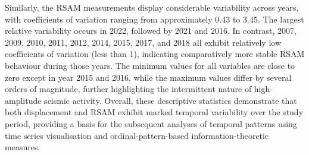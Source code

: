 \documentclass[12pt,a4paper]{article}
\begin{document}
Similarly, the RSAM measurements display considerable variability across years, with coefficients of variation ranging from approximately 0.43 to 3.45. The largest relative variability occurs in 2022, followed by 2021 and 2016. In contrast, 2007, 2009, 2010, 2011, 2012, 2014, 2015, 2017, and 2018 all exhibit relatively low coefficients of variation (less than 1), indicating comparatively more stable RSAM behaviour during those years. The minimum values for all variables are close to zero except in year 2015 and 2016, while the maximum values differ by several orders of magnitude, further highlighting the intermittent nature of high-amplitude seismic activity. Overall, these descriptive statistics demonstrate that both displacement and RSAM exhibit marked temporal variability over the study period, providing a basis for the subsequent analyses of temporal patterns using time series visualisation and ordinal-pattern-based information-theoretic measures.
\end{document}
